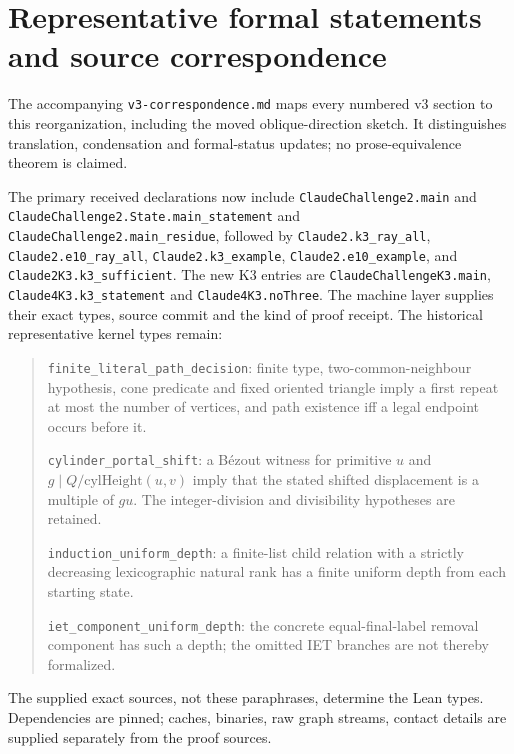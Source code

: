 \documentclass[11pt]{amsart}
\newcommand{\record}[1]{\nolinkurl{#1}}
\theoremstyle{definition}\newtheorem{definition}{Definition}
\begin{document}
\section{Representative formal statements and source correspondence}\label{app:correspondence}
The accompanying \record{v3-correspondence.md} maps every numbered v3
section to this reorganization, including the moved oblique-direction
sketch. It distinguishes translation, condensation and formal-status
updates; no prose-equivalence theorem is claimed.

The primary received declarations now include
\record{ClaudeChallenge2.main} and
\record{ClaudeChallenge2.State.main_statement} and
\record{ClaudeChallenge2.main_residue}, followed by
\record{Claude2.k3_ray_all}, \record{Claude2.e10_ray_all},
\record{Claude2.k3_example}, \record{Claude2.e10_example}, and
\record{Claude2K3.k3_sufficient}. The new K3 entries are
\record{ClaudeChallengeK3.main}, \record{Claude4K3.k3_statement} and
\record{Claude4K3.noThree}. The machine layer supplies their exact
types, source commit and the kind of proof receipt. The historical
representative kernel types remain:
\begin{quote}\small
\record{finite_literal_path_decision}: finite type, two-common-neighbour
hypothesis, cone predicate and fixed oriented triangle imply a first
repeat at most the number of vertices, and path existence iff a legal
endpoint occurs before it.\par
\record{cylinder_portal_shift}: a B\'ezout witness for primitive $u$
and $g\mid Q/\mathrm{cylHeight}(u,v)$ imply that the stated shifted
displacement is a multiple of $gu$. The integer-division and
divisibility hypotheses are retained.\par
\record{induction_uniform_depth}: a finite-list child relation with a
strictly decreasing lexicographic natural rank has a finite uniform
depth from each starting state.\par
\record{iet_component_uniform_depth}: the concrete equal-final-label
removal component has such a depth; the omitted IET branches are not
thereby formalized.
\end{quote}
The supplied exact sources, not these paraphrases, determine the Lean
types. Dependencies are pinned; caches, binaries, raw graph streams,
contact details are supplied separately from the proof sources.
\end{document}
